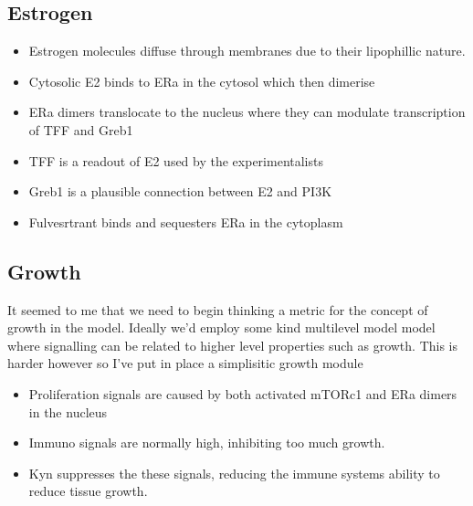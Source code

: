 \documentclass{article}
\begin{document}
    \subsection{Estrogen}
    \begin{itemize}
        \item Estrogen molecules diffuse through membranes due to their lipophillic nature.
        \item Cytosolic E2 binds to ERa in the cytosol which then dimerise
        \item ERa dimers translocate to the nucleus where they can modulate transcription of TFF and Greb1
        \item TFF is a readout of E2 used by the experimentalists
        \item Greb1 is a plausible connection between E2 and PI3K
        \item Fulvesrtrant binds and sequesters ERa in the cytoplasm
    \end{itemize}

    \subsection{Growth}
    It seemed to me that we need to begin thinking a metric for the concept of growth in the model.
    Ideally we'd employ some kind multilevel model model where signalling  can be related to higher level properties such as growth.
    This is harder however so I've put in place a simplisitic growth module

    \begin{itemize}
        \item Proliferation signals are caused by both activated mTORc1 and ERa dimers in the nucleus
        \item Immuno signals are normally high, inhibiting too much growth.
        \item Kyn suppresses the these signals, reducing the immune systems ability to reduce tissue growth.
    \end{itemize}
\end{document}
